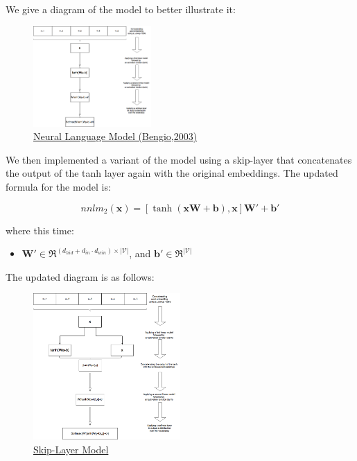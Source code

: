 \documentclass[11pt]{article}
\begin{document}
\noindent We give a diagram of the model to better illustrate it:

\begin{figure}[H]
\begin{center}
    \includegraphics[width=0.4\textwidth]{reg.png}
    \caption{\underline{Neural Language Model (Bengio,2003)}}
\end{center}
\end{figure}

We then implemented a variant of the model using a skip-layer that concatenates the output of the tanh layer again with the original embeddings. The updated formula for the model is:

$$ nnlm_2(\boldsymbol{x}) = [\tanh(\boldsymbol{xW}+\boldsymbol{b}),\boldsymbol{x}]\boldsymbol{W'}+\boldsymbol{b'}$$

where this time:
\begin{itemize}
\item $\boldsymbol{W'}\in \Re^{(d_{hid}+ d_{in}\cdot d_{win})\times |\mathcal{V}|}$, and $\boldsymbol{b'}\in \Re^{|\mathcal{V}|}$
\end{itemize}

The updated diagram is as follows:
\begin{figure}[H]
\begin{center}
    \includegraphics[width=0.5\textwidth]{skip.png}
    \caption{\underline{Skip-Layer Model}}
\end{center}
\end{figure}
\end{document}
